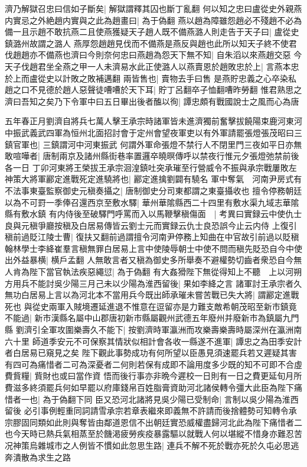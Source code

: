 濟乃解獄召忠曰信如子斷矣|{
	解獄謂釋其囚也斷丁亂翻}
何以知之忠曰盧從史外親燕内實忌之外絶趙内實與之此為趙畫曰|{
	為于偽翻}
燕以趙為障雖怨趙必不殘趙不必為備一且示趙不敢抗燕二且使燕獲疑天子趙人既不備燕潞人則走告于天子曰|{
	盧從史鎮潞州故謂之潞人}
燕厚怨趙趙見伐而不備燕是燕反與趙也此所以知天子終不使君伐趙趙亦不備燕也濟曰今則奈何忠曰燕趙為怨天下無不知|{
	自朱滔以來燕趙交惡}
今天子伐趙君坐全燕之甲一人未濟易水此正使潞人以燕賣恩於趙敗忠於上|{
	言燕本忠於上而盧從史以計敗之敗補邁翻}
兩皆售也|{
	賣物去手曰售}
是燕貯忠義之心卒染私趙之口不見德於趙人惡聲徒嘈嘈於天下耳|{
	貯丁呂翻卒子恤翻嘈昨勞翻}
惟君熟思之濟曰吾知之矣乃下令軍中曰五日畢出後者醢以徇|{
	譚忠頗有戰國說士之風而心為唐}


五年春正月劉濟自將兵七萬人擊王承宗時諸軍皆未進濟獨前奮擊拔饒陽束鹿河東河中振武義武四軍為恒州北面招討會于定州會望夜軍吏以有外軍請罷張燈張茂昭曰三鎮官軍也|{
	三鎮謂河中河東振武}
何謂外軍命張燈不禁行人不閉里門三夜如平日亦無敢喧嘩者|{
	唐制兩京及諸州縣街巷率置邏卒曉暝傳呼以禁夜行惟元夕張燈弛禁前後各一日}
丁卯河東將王榮拔王承宗洄湟鎮吐突承璀至行營威令不振與承宗戰屢敗左神策大將軍酈定進戰死定進驍將也|{
	酈定進擒劉闢有驍名}
軍中奪氣　河南尹房式有不法事東臺監察御史元稹奏攝之|{
	唐制御史分司東都謂之東臺攝收也}
擅令停務朝廷以為不可罸一季俸召還西京至敷水驛|{
	華州華隂縣西二十四里有敷水渠九域志華隂縣有敷水鎮}
有内侍後至破驛門呼罵而入以馬鞭擊稹傷面　|{
	考異曰實録云中使仇士良與元稹爭廳按稹及白居易傳皆云劉士元而實録云仇士良恐誤今止云内侍}
上復引稹前過貶江陵士曹|{
	復扶又翻前過謂擅令河南尹停務上知曲在中官故引前過以貶稹}
翰林學士李絳崔羣言稹無罪白居易上言中使陵辱朝士中使不問而稹先貶恐自今中使出外益暴横|{
	横戶孟翻}
人無敢言者又稹為御史多所舉奏不避權勢切齒者衆恐自今無人肯為陛下當官執法疾惡繩愆|{
	為于偽翻}
有大姦猾陛下無從得知上不聽　上以河朔方用兵不能討吳少陽三月己未以少陽為淮西留後|{
	果如李絳之言}
諸軍討王承宗者久無功白居易上言以為河北本不當用兵今既出師承璀未嘗苦戰已失大將|{
	謂酈定進戰死也}
與從史兩軍入賊境遷延進退不惟意在逗留亦是力難支敵希朝茂昭至新市鎮竟不能過|{
	新市漢縣名屬中山郡唐初新市縣屬觀州武德五年廢州并廢新市為鎮屬九門縣}
劉濟引全軍攻圍樂壽久不能下|{
	按劉濟時軍瀛洲而攻樂壽樂壽時屬深州在瀛洲南六十里}
師道季安元不可保察其情狀似相計會各收一縣遂不進軍|{
	譚忠之為田季安計者白居易已窺見之矣}
陛下觀此事勢成功有何所望以臣愚見須速罷兵若又遲疑其害有四可為痛惜者二可為深憂者二何則若保有成即不論用度多少既的知不可即不合虛費貲糧|{
	貲財也或曰當作資}
悟而後行事亦非晩今遲校一日則有一日之費更延旬月所費滋多終須罷兵何如早罷以府庫錢帛百姓脂膏資助河北諸侯轉令彊大此臣為陛下痛惜者一也|{
	為于偽翻下同}
臣又恐河北諸將見吳少陽已受制命|{
	言制以吳少陽為淮西留後}
必引事例輕重同詞請雪承宗若章表繼來即義無不許請而後捨體勢可知轉令承宗膠固同類如此則與奪皆由鄰道恩信不出朝廷實恐威權盡歸河北此為陛下痛惜者二也今天時已熱兵氣相蒸至於饑渇疲勞疾疫暴露驅以就戰人何以堪縱不惜身亦難忍苦况神策烏雜城市之人例皆不慣如此忽思生路|{
	連兵不解不死於戰亦死於久屯必思逃奔潰散為求生之路}

